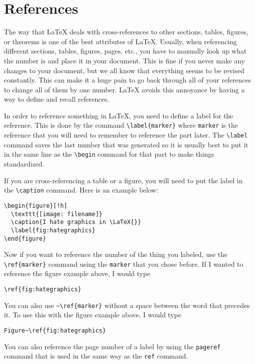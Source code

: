 \section{References}
\label{sec:references}

The way that \LaTeX{} deals with cross-references to other sections,
tables, figures, or theorems is one of the best attributes of
\LaTeX{}.  Usually, when referencing different sections, tables,
figures, pages, etc., you have to manually look up what the number is
and place it in your document.  This is fine if you never make any
changes to your document, but we all know that everything seems to be
revised constantly.  This can make it a huge pain to go back through
all of your references to change all of them by one number.  \LaTeX{}
avoids this annoyance by having a way to define and recall references.

In order to reference something in \LaTeX{}, you need to define a
label for the reference.  This is done by the command
\verb=\label{marker}= where \texttt{marker} is the reference that you
will need to remember to reference the part later.  The \verb=\label=
command saves the last number that was generated so it is usually best
to put it in the same line as the \verb=\begin= command for that part
to make things standardized.

If you are cross-referencing a table or a figure, you will need to put
the label in the \verb=\caption= command.  Here is an example below:
\begin{verbatim}
\begin{figure}[!h]
  \texttt{[image: filename]}
  \caption{I hate graphics in \LaTeX{}}
  \label{fig:hategraphics}
\end{figure}
\end{verbatim}

Now if you want to reference the number of the thing you labeled, use
the \verb=\ref{marker}= command using the \texttt{marker} that you
chose before.  If I wanted to reference the figure example above, I
would type
\begin{verbatim}
\ref{fig:hategraphics}
\end{verbatim}
You can also use \verb=~\ref{marker}= without a space between the word
that precedes it.  To use this with the figure example above, I would
type
\begin{verbatim}
Figure~\ref{fig:hategraphics}
\end{verbatim}
You can also reference the page number of a label by using the
\texttt{pageref} command that is used in the same way as the
\texttt{ref} command.

